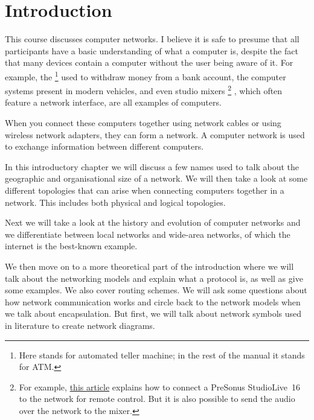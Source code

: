 \chapter{Introduction}
\label{chap:introduction}

This course discusses computer networks.
I believe it is safe to presume that all participants have a basic understanding of what a computer is, despite the fact that many devices contain a computer without the user being aware of it.
For example, the %
   \footnote{Here  stands for automated teller machine; in the rest of the manual it stands for \acl{ATM}.}
used to withdraw money from a bank account, the computer systems present in modern vehicles, and even studio mixers%
   \footnote{For example, \href{https://www.presonus.com/learn/technical-articles/How-To-Network-Studiolive-Digital-Mixers-for-Remote-Control}{this article} explains how to connect a PreSonus Studio\-Live~16 to the network for remote control. But it is also possible to send the audio over the network to the mixer.}
, which often feature a network interface, are all examples of computers.
    
When you connect these computers together using network cables or using wireless network adapters, they can form a network.
A computer network is used to exchange information between different computers.

In this introductory chapter we will discuss a few names used to talk about the geographic and organisational size of a network.
We will then take a look at some different topologies that can arise when connecting computers together in a network.
This includes both physical and logical topologies.

Next we will take a look at the history and evolution of computer networks and we differentiate between 
local networks and wide-area networks, of which the internet is the best-known example.

We then move on to a more theoretical part of the introduction where we will talk about the networking models and explain what a protocol is, as well as give some examples.
We also cover routing schemes.
We will ask some questions about how network communication works and circle back to the network models when we talk about encapsulation.
But first, we will talk about network symbols used in literature to create network diagrams.



